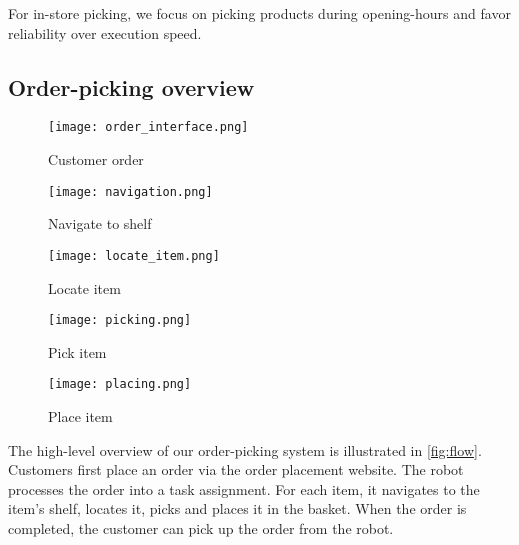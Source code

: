 For in-store picking, we focus on picking products during opening-hours and favor reliability over execution speed. 



\subsection{Order-picking overview}
\label{sec:order_system_overview}



\begin{figure*}[h]
  \centering
  \begin{subfigure}[b]{0.18\linewidth}
    \centering
    \texttt{[image: order\_interface.png]}
    \caption{Customer order}
  \end{subfigure}%
  \begin{subfigure}[b]{0.18\linewidth}
    \centering
    \texttt{[image: navigation.png]}
    \caption{Navigate to shelf}
  \end{subfigure}
  \begin{subfigure}[b]{0.18\linewidth}
    \centering
    \texttt{[image: locate\_item.png]}
    \caption{Locate item}
  \end{subfigure}
  \begin{subfigure}[b]{0.18\linewidth}
    \centering
    \texttt{[image: picking.png]}
    \caption{Pick item}
  \end{subfigure}
  \begin{subfigure}[b]{0.18\linewidth}
    \centering
    \texttt{[image: placing.png]}
    \caption{Place item}
  \end{subfigure}
  \caption{Overview of ideal flow of symbolic actions to complete an order.}
  \label{fig:flow}
\end{figure*}


%
The high-level overview of our order-picking system is
illustrated in \cref{fig:flow}.
Customers first place an order via the order placement website. 
The robot processes the order into a task assignment. 
For each item, it navigates to the item's shelf, locates it, picks and places it in the basket.
When the order is completed, the customer can pick up the order from the robot.





